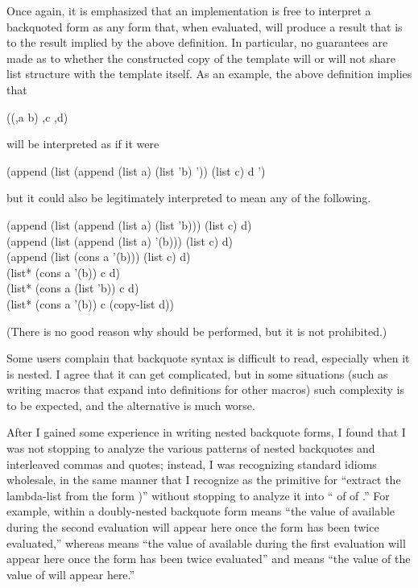 \begin{flushdesc}
Once again, it is emphasized that an implementation is free to interpret
a backquoted form as any form that, when evaluated, will produce a result
that is  to the result implied by the above definition.
In particular, no guarantees are made as to whether the constructed
copy of the template will or will not share list structure with the
template itself.  As an example, the above definition implies that
\begin{lisp}
{\Xbq}((,a b) ,c ,{\Xatsign}d)
\end{lisp}
will be interpreted as if it were
\begin{lisp}
(append (list (append (list a) (list 'b) '{\nil})) (list c) d '{\nil})
\end{lisp}
but it could also be legitimately interpreted to mean any of the following.
\begin{lisp}
(append (list (append (list a) (list 'b))) (list c) d) \\
(append (list (append (list a) '(b))) (list c) d) \\
(append (list (cons a '(b))) (list c) d) \\
(list* (cons a '(b)) c d) \\
(list* (cons a (list 'b)) c d) \\
(list* (cons a '(b)) c (copy-list d))
\end{lisp}
(There is no good reason why  should be performed, but
it is not prohibited.)


\begin{new}
Some users complain that backquote syntax is difficult to read,
especially when it is nested.  I agree that it can get complicated,
but in some situations (such as writing macros that expand into
definitions for other macros) such complexity is to be expected,
and the alternative is much worse.

After I gained some experience in writing nested backquote forms,
I found that I was not stopping to analyze the various patterns
of nested backquotes and interleaved commas and quotes; instead, I was
recognizing standard idioms wholesale, in the same manner that I recognize 
as the primitive for ``extract the lambda-list from the
form )'' without stopping to analyze it into
`` of  of .''  For example,  within
a doubly-nested backquote form means ``the value of  available
during the second evaluation
will appear here once the form has been twice
evaluated,'' whereas  means ``the value of  available during the
first evaluation will appear here once the form has been twice
evaluated'' and  means ``the value of the value of  will appear here.''


\end{new}
\end{flushdesc}
